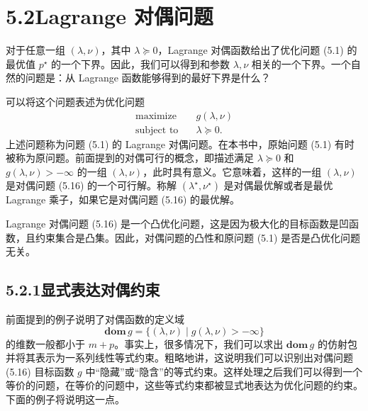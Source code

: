 \documentclass[UTF8,12pt,a4paper,fontset=fandol]{ctexart}
\begin{document}
\section*{5.2\quad Lagrange 对偶问题}

对于任意一组 $(\lambda,\nu)$，其中 $\lambda\succeq 0$，Lagrange 对偶函数给出了优化问题 (5.1) 的最优值 $p^\star$ 的一个下界。因此，我们可以得到和参数 $\lambda,\nu$ 相关的一个下界。一个自然的问题是：从 Lagrange 函数能够得到的最好下界是什么？

可以将这个问题表述为优化问题
\begin{equation}
\begin{aligned}
\text{maximize}\quad & g(\lambda,\nu)\\
\text{subject to}\quad & \lambda\succeq 0.
\end{aligned}
\tag{5.16}
\end{equation}
上述问题称为问题 (5.1) 的 Lagrange 对偶问题。在本书中，原始问题 (5.1) 有时被称为原问题。前面提到的对偶可行的概念，即描述满足 $\lambda\succeq 0$ 和 $g(\lambda,\nu)>-\infty$ 的一组 $(\lambda,\nu)$，此时具有意义。它意味着，这样的一组 $(\lambda,\nu)$ 是对偶问题 (5.16) 的一个可行解。称解 $(\lambda^\star,\nu^\star)$ 是对偶最优解或者是最优 Lagrange 乘子，如果它是对偶问题 (5.16) 的最优解。

Lagrange 对偶问题 (5.16) 是一个凸优化问题，这是因为极大化的目标函数是凹函数，且约束集合是凸集。因此，对偶问题的凸性和原问题 (5.1) 是否是凸优化问题无关。

\subsection*{5.2.1\quad 显式表达对偶约束}

前面提到的例子说明了对偶函数的定义域
\[
\mathbf{dom}\,g=\{(\lambda,\nu)\mid g(\lambda,\nu)>-\infty\}
\]
的维数一般都小于 $m+p$。事实上，很多情况下，我们可以求出 $\mathbf{dom}\,g$ 的仿射包并将其表示为一系列线性等式约束。粗略地讲，这说明我们可以识别出对偶问题 (5.16) 目标函数 $g$ 中``隐藏''或``隐含''的等式约束。这样处理之后我们可以得到一个等价的问题，在等价的问题中，这些等式约束都被显式地表达为优化问题的约束。下面的例子将说明这一点。
\end{document}
